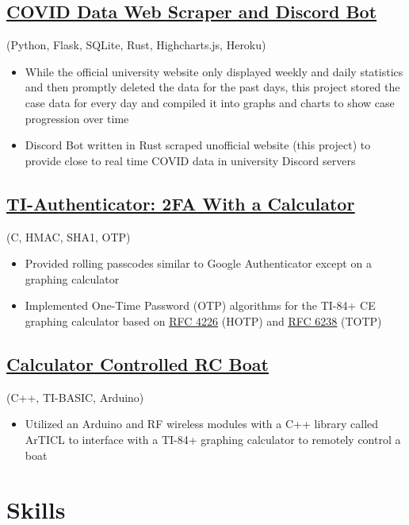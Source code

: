 \documentclass{article}
\begin{document}
\subsection{\href{https://github.com/jshin313/unofficial-temple-covid-live-dashboard}{\underline{COVID Data Web Scraper and Discord Bot}}} (Python, Flask, SQLite, Rust, Highcharts.js, Heroku)
\begin{itemize}
    \item While the official university website only displayed weekly and daily statistics and then promptly deleted the data for the past days, this project stored the case data for every day and compiled it into graphs and charts to show case progression over time
    \item Discord Bot written in Rust scraped unofficial website (this project) to provide close to real time COVID data in university Discord servers
\end{itemize}

\subsection{\href{https://github.com/jshin313/ti-authenticator}{\underline{TI-Authenticator: 2FA With a Calculator}}} (C, HMAC, SHA1, OTP)
\begin{itemize}
    \item Provided rolling passcodes similar to Google Authenticator except on a graphing calculator
    \item Implemented One-Time Password (OTP) algorithms for the TI-84+ CE graphing calculator based on \href{https://tools.ietf.org/html/rfc4226}{\underline{RFC 4226}} (HOTP) and \href{https://tools.ietf.org/html/rfc6238}{\underline{RFC 6238}} (TOTP)
\end{itemize}

\subsection{\href{https://github.com/jshin313/CalcControlledBoat}{\underline{Calculator Controlled RC Boat}}} (C++, TI-BASIC, Arduino)
\begin{itemize}
    \item Utilized an Arduino and RF wireless modules with a C++ library called ArTICL to interface with a TI-84+ graphing calculator to remotely control a boat
\end{itemize}

\section{Skills}
\end{document}
